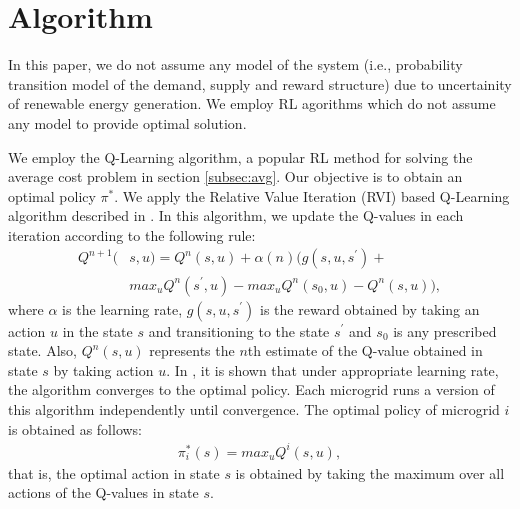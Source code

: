\section{Algorithm}\label{sec:algo}


 In this paper, we do not assume any model of the system (i.e., probability transition model of the demand, supply and reward structure) due to uncertainity of renewable energy generation. We employ RL agorithms which do not assume any model to provide optimal solution.

We employ the Q-Learning algorithm, a  popular RL method for solving the average cost problem in section \ref{subsec:avg}.
 Our objective is to obtain an optimal policy $\pi^{*}$.
We apply the Relative Value Iteration (RVI) based Q-Learning algorithm described in \cite{avgcost}. In this algorithm, we update the Q-values in each iteration according to the following rule:
\begin{align}
Q^{n+1}(&s,u) = Q^{n}(s,u) + \alpha(n)(g(s,u,s^{'}) + \nonumber\\ &  max_{u} Q^{n}(s^{'},u) - max_{u} Q^{n}(s_{0},u) - Q^{n}(s,u)),
\end{align}
where $\alpha$ is the learning rate, $g(s,u,s^{'})$ is the reward obtained by taking an action $u$ in the state $s$ and transitioning to the state $s^{'}$ and $s_{0}$ is any prescribed state.
Also, $Q^n(s,u)$ represents the $n$th estimate of the Q-value  obtained in state $s$ by taking action $u$. In \cite{avgcost}, it is shown that under appropriate learning rate, the algorithm converges to the  optimal policy. 
Each microgrid runs a version of this algorithm independently until convergence. The optimal policy of microgrid $i$ is obtained as follows:
\begin{align}
\pi_{i}^{*}(s) = max_{u}Q^{i}(s,u),
\end{align}
that is, the optimal action in state $s$ is obtained by taking the maximum over all actions of the Q-values in state $s$.  

